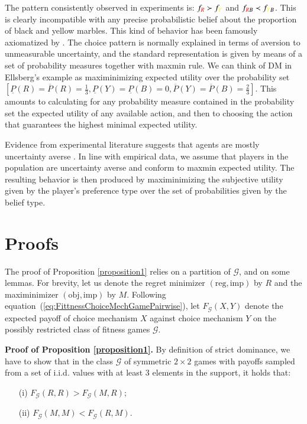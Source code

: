 \documentclass[fleqn,reqno,12pt]{article}
\theoremstyle{Satz}
\theoremstyle{Bsp}
\begin{document}
The pattern consistently observed in experiments is:
$f_{{\color{red}R}} \succ f_{{\color{yellow}Y}}$ and
$f_{{\color{red}R}B} \prec f_{{\color{yellow}Y}B}$. This is clearly incompatible with any
precise probabilistic belief about the proportion of black and yellow marbles. This kind of
behavior has been famously axiomatized by \citet{gilsch89}. The
choice pattern is normally explained in terms of aversion to unmeasurable uncertainty, and the standard
representation is given by means of a set of probability measures together with maxmin rule. We
can think of DM in Ellsberg's example as maximinimizing expected utility over the
probability set
$
[\underline{P}(R)=\overline{P}(R)=\frac{1}{3}, \underline{P}(Y)= \underline{P}(B)=0, \overline{P}(Y)= \overline{P}(B)=\frac{2}{3}]
$.
This amounts to calculating for any probability measure contained in the probability set the
expected utility of any available action, and then to choosing the action that guarantees the
highest minimal expected utility. 

Evidence from experimental literature suggests that agents are mostly uncertainty averse \citep[e.g.,][]{TrautKuil16}. In line with empirical data, we assume that players in the population
are uncertainty averse and conform to maxmin expected utility. The resulting behavior is then
produced by maximinimizing the subjective utility given by the player's preference type over
the set of probabilities given by the belief type.

\fi

\section{Proofs}
\label{sec:proofs}

The proof of Proposition \ref{proposition1} relies on a partition of $\mathcal{G}$, and on some
lemmas. For brevity, let us denote the regret minimizer $(\text{reg}, \text{imp})$ by $R$ and
the maximinimizer $(\text{obj}, \text{imp})$ by $M$. Following
equation~(\ref{eq:FittnessChoiceMechGamePairwise}), let $F_{\mathcal{G}}(X,Y)$ denote the
expected payoff of choice mechanism $X$ against choice mechanism $Y$ on the possibly restricted
class of fitness games $\mathcal{G}$.

\vspace{.5cm}


\noindent \textbf{Proof of Proposition \ref{proposition1}.} By definition of strict dominance,
we have to show that in the class $\mathcal{G}$ of symmetric $2\times2$ games with payoffs
sampled from a set of i.i.d. values with at least 3 elements in the support, it holds that:
\begin{multicols}{2}
  \begin{itemize}
  \item[(i)] $F_{\mathcal{G}}(R,R)>F_{\mathcal{G}}(M,R);$
  \item[(ii)] $F_{\mathcal{G}}(M,M)<F_{\mathcal{G}}(R,M).$
  \end{itemize}
\end{multicols}
\end{document}
